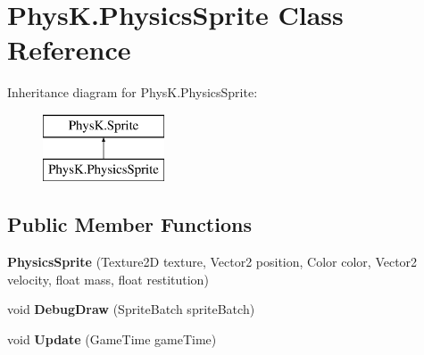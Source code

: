 \hypertarget{class_phys_k_1_1_physics_sprite}{}\section{Phys\+K.\+Physics\+Sprite Class Reference}
\label{class_phys_k_1_1_physics_sprite}
Inheritance diagram for Phys\+K.\+Physics\+Sprite\+:\begin{figure}[H]
\begin{center}
\leavevmode
\includegraphics[height=2.000000cm]{class_phys_k_1_1_physics_sprite}
\end{center}
\end{figure}
\subsection*{Public Member Functions}
\begin{DoxyCompactItemize}
\item 
{\bfseries Physics\+Sprite} (Texture2D texture, Vector2 position, Color color, Vector2 velocity, float mass, float restitution)\hypertarget{class_phys_k_1_1_physics_sprite_a44aad16a56a238c79a152d8054da916e}{}\label{class_phys_k_1_1_physics_sprite_a44aad16a56a238c79a152d8054da916e}

\item 
void {\bfseries Debug\+Draw} (Sprite\+Batch sprite\+Batch)\hypertarget{class_phys_k_1_1_physics_sprite_a44514ba961775c5d5f92842936078fd3}{}\label{class_phys_k_1_1_physics_sprite_a44514ba961775c5d5f92842936078fd3}

\item 
void {\bfseries Update} (Game\+Time game\+Time)\hypertarget{class_phys_k_1_1_physics_sprite_a3ddcb5b1e5808270108859f7a374ab0c}{}\label{class_phys_k_1_1_physics_sprite_a3ddcb5b1e5808270108859f7a374ab0c}

\end{DoxyCompactItemize}
